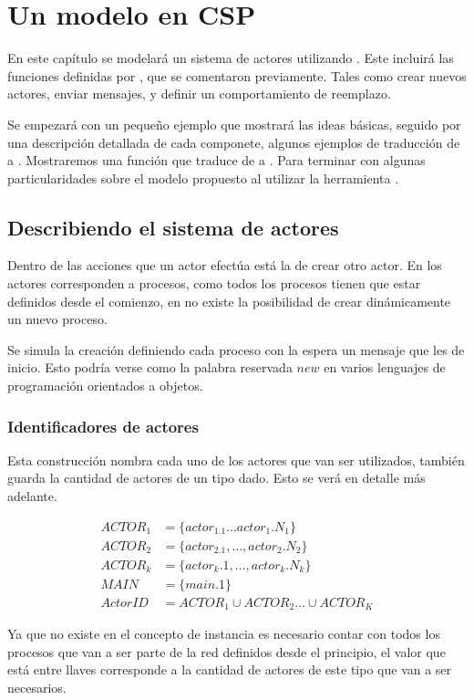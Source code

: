 \chapter{Un modelo en CSP}
En este capítulo se modelará un sistema de actores utilizando \CSP. Este incluirá las funciones definidas por \SAL, que se comentaron previamente. Tales como crear nuevos actores, enviar mensajes, y definir un comportamiento de reemplazo. 

Se empezará con un pequeño ejemplo que mostrará las ideas básicas, seguido por una descripción detallada de cada componete, algunos ejemplos de traducción de \SAL a \CSP. Mostraremos una función que traduce de \SAL a \CSP. Para terminar con algunas particularidades sobre el modelo propuesto al utilizar la herramienta \FDR.

\section{Describiendo el sistema de actores} 
Dentro de las acciones que un actor efectúa está la de crear otro actor. En \CSP los actores corresponden a procesos, como todos los procesos tienen que estar definidos desde el comienzo, en \CSP no existe la posibilidad de crear dinámicamente un nuevo proceso.

Se simula la creación definiendo cada proceso con la espera un mensaje que les de inicio. Esto podría verse como la palabra reservada $new$ en varios lenguajes de programación orientados a objetos. 

\subsection{Identificadores de actores}
Esta construcción nombra cada uno de los actores que van ser utilizados, también guarda la cantidad de actores de un tipo dado. Esto se verá en detalle más adelante.

\begin{align*}
  ACTOR_1 &= \{actor_1.1 \ldots actor_1.N_1\} \\
  ACTOR_2 &= \{actor_2.1, \ldots ,actor_2.N_2\} \\
  ACTOR_k &= \{actor_k.1, \ldots, actor_k.N_k\} \\
  MAIN &= \{main.1\} \\
  ActorID &= ACTOR_1 \cup ACTOR_2 \ldots \cup ACTOR_K
\end{align*}

Ya que no existe en \CSP el concepto de instancia es necesario contar con todos los procesos que van a ser parte de la red definidos desde el principio, el valor que está entre llaves corresponde a la cantidad de actores de este tipo que van a ser necesarios. 

